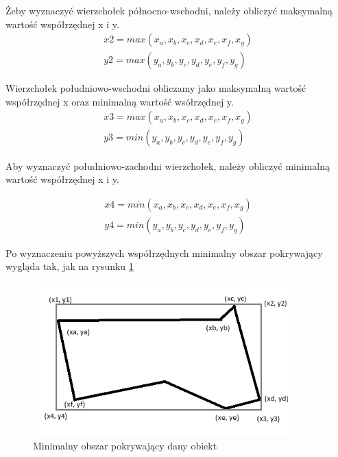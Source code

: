 Żeby wyznaczyć wierzchołek północno-wschodni, należy obliczyć maksymalną wartość współrzędnej x i y.
\begin{equation} \label{sec:trzeciWierzcholek}
\begin{split}
x2 = max(x_a, x_b, x_c, x_d, x_e, x_f, x_g)  \\
y2 = max(y_a, y_b, y_c, y_d, y_e, y_f, y_g)
\end{split}
\end{equation}\newline

Wierzchołek południowo-wschodni obliczamy jako maksymalną wartość współrzędnej x oraz minimalną wartość wsółrzędnej y.
\begin{equation} \label{sec:czwartyWierzcholek}
\begin{split}
x3 = max(x_a, x_b, x_c, x_d, x_e, x_f, x_g) \\
y3 = min(y_a, y_b, y_c, y_d, y_e, y_f, y_g)
\end{split}
\end{equation}\newline

Aby wyznaczyć południowo-zachodni wierzchołek, należy obliczyć minimalną wartość współrzędnej x i y.

\begin{equation} \label{sec:pierwszyWierzcholek}
\begin{split}
x4 = min(x_a, x_b, x_c, x_d, x_e, x_f, x_g) \\
y4 = min(y_a, y_b, y_c, y_d, y_e, y_f, y_g)
\end{split}
\end{equation}\newline

Po wyznaczeniu powyższych współrzędnych minimalny obszar pokrywający wygląda tak, jak na rysunku \ref{sec:secondtBB}


\begin{figure}[h]
\caption{Minimalny obszar pokrywający dany obiekt}
\label{sec:secondtBB}
\centering
\includegraphics[width=0.9\textwidth]{minBoundingBox}
\end{figure}

